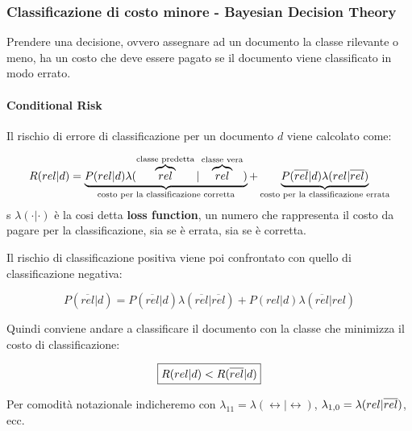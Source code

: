 

\subsubsection{Classificazione di costo minore - Bayesian Decision Theory}

Prendere una decisione, ovvero assegnare ad un documento la classe rilevante o meno, ha un costo che deve essere pagato se il documento viene classificato in modo errato.

\paragraph{Conditional Risk} Il rischio di errore di classificazione per un documento $d$ viene calcolato come:

$$
R(rel | d) = \underbrace{P(rel | d) \lambda (\overbrace{rel}^{\text{classe predetta}} | \overbrace{rel}^{\text{classe vera}})}_{\text{costo per la classificazione corretta}} + \underbrace{P(\overline{rel} | d) \lambda (rel | \overline{rel})}_{\text{costo per la classificazione errata}}
$$
s
\noindent $\lambda(\cdot | \cdot)$ è la cosi detta \textbf{loss function}, un numero che rappresenta il costo da pagare per la classificazione, sia se è errata, sia se è corretta.

Il rischio di classificazione positiva viene poi confrontato con quello di classificazione negativa:

$$
P(\overline{rel} | d) = P(\overline{rel}|d)\lambda(\overline{rel}|\overline{rel}) + P(rel|d)\lambda(\overline{rel}|rel)
$$

Quindi conviene andare a classificare il documento con la classe che minimizza il costo di classificazione:

$$
\boxed{R(rel|d) < R(\overline{rel}|d)}
$$

Per comodità notazionale indicheremo con $\lambda_{11} = \lambda (\rel | \rel)$, $\lambda_{1,0} =\lambda (rel | \overline{rel})$, ecc.

